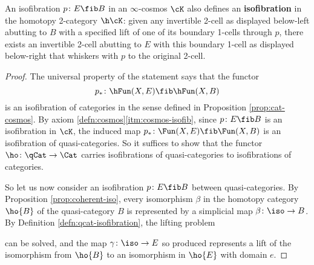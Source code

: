   \begin{proposition}\label{prop:isofib-define-isofib}
     An isofibration $p \colon E \fib B$  in an $\infty$-cosmos $\cK$ also defines an \textbf{isofibration} in the homotopy 2-category $\h\cK$: given any invertible 2-cell as displayed below-left abutting to $B$ with a specified lift of one of its boundary 1-cells through $p$, there exists an invertible 2-cell abutting to $E$ with this boundary 1-cell as displayed below-right that whiskers with $p$ to the original 2-cell.
  \begin{center}
  \end{center}
  \end{proposition}
  \begin{proof} The universal property of the statement says that the functor \[p_* \colon \hFun(X,E) \fib \hFun(X,B)\] is an isofibration of categories in the sense defined in Proposition \ref{prop:cat-cosmos}. By axiom \ref{defn:cosmos}\ref{itm:cosmos-isofib}, since $p \colon E \fib B$ is an isofibration in $\cK$, the induced map $p_* \colon \Fun(X,E) \fib \Fun(X,B)$ is an isofibration of quasi-categories. So it suffices to show that the functor $\ho \colon \qCat\to \Cat$ carries isofibrations of quasi-categories to isofibrations of categories.

  So let us now consider an isofibration $p \colon E \fib B$ between quasi-categories. By Proposition \ref{prop:coherent-iso}, every isomorphism $\beta$ in the homotopy category $\ho{B}$ of the quasi-category $B$ is represented by a simplicial map $\beta \colon \iso \to B$. By Definition \ref{defn:qcat-isofibration}, the lifting problem
  \begin{center}
  \end{center}
  can be solved, and the map $\gamma \colon \iso \to E$ so produced represents a lift of the isomorphism from $\ho{B}$ to an isomorphism in $\ho{E}$ with domain $e$.
  \end{proof}


